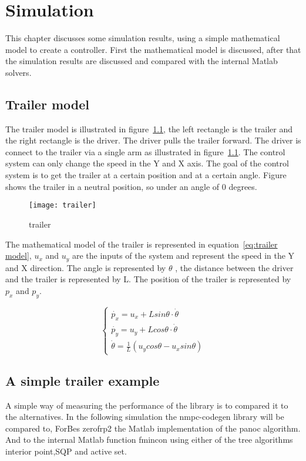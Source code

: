 \chapter{Simulation}
This chapter discusses some simulation results, using a simple mathematical model to create a controller. First the mathematical model is discussed, after that the simulation results are discussed and compared with the internal Matlab solvers.

\section{Trailer model}
The trailer model is illustrated in figure~\ref{fig:trailer model}, the left rectangle is the trailer and the right rectangle is the driver. The driver pulls the trailer forward. The driver is connect to the trailer via a single arm as illustrated in figure~\ref{fig:trailer model}. The control system can only change the speed in the Y and X axis. The goal of the control system is to get the trailer at a certain position and at a certain angle. Figure shows the trailer in a neutral position, so under an angle of 0 degrees.

\begin{figure}
	\centering
	\texttt{[image: trailer]}
	\caption{trailer}
	\label{fig:trailer model}
\end{figure}

The mathematical model of the trailer is represented in equation~\ref{eq:trailer model}, $u_x$ and $u_y$ are the inputs of the system and represent the speed in the Y and X direction. The angle is represented by $\theta$ , the distance between the driver and the trailer is represented by L. The position of the trailer is represented by $p_x$ and $p_y$.

\begin{equation}
	\begin{cases}
		\dot{p_x} = u_x + L sin \theta \cdot \dot{\theta} \\
		\dot{p_y} = u_y + L cos \theta \cdot \dot{\theta} \\
		\dot{\theta} = \frac{1}{L}(u_ycos \theta - u_x sin \theta)	
	\end{cases}
	\label{eq:trailer model}
\end{equation}

\section{A simple trailer example}
A simple way of measuring the performance of the library is to compared it to the alternatives. In the following simulation the nmpc-codegen library will be compared to, ForBes zerofrp2 the Matlab implementation of the panoc algorithm. And to the internal Matlab function fmincon using either of the tree algorithms interior point,SQP and active set.

